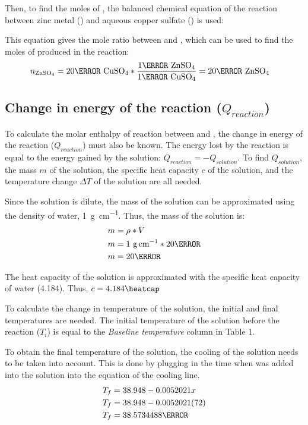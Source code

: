 \documentclass[demo, 12pt, notitlepage, letterpaper]{report}
\begin{document}
Then, to find the moles of , the balanced chemical equation of the reaction between zinc metal () and aqueous copper sulfate () is used:

\centerline{}

This equation gives the mole ratio between  and , which can be used to find the moles of  produced in the reaction:
\begin{align*}
	n_{\ce{ZnSO4}} & = 20\mmol~\ce{CuSO4} * \frac{1\mol~{\ce{ZnSO4}}}{1\mol~{\ce{CuSO4}}} = 20\mmol~{\ce{ZnSO4}}
\end{align*}

\subsection*{Change in energy of the reaction ($Q_{reaction}$)}

To calculate the molar enthalpy of reaction between  and , the change in energy of the reaction ($Q_{reaction}$) must also be known. The energy lost by the reaction is equal to the energy gained by the solution: $Q_{reaction} = -Q_{solution}$. To find $Q_{solution}$, the mass $m$ of the solution, the specific heat capacity $c$ of the solution, and the temperature change $\Delta T$ of the solution are all needed.

Since the solution is dilute, the mass of the solution can be approximated using the density of water, 1~\unit{\gram\per\cm}. Thus, the mass of the solution is:
\begin{align*}
	m & = \rho * V                      \\
	m & = 1~\unit{\gram\per\cm} * 20\ml \\
	m & = 20\gram
\end{align*}

The heat capacity of the solution is approximated with the specific heat capacity of water (4.184\heatcap). Thus, $c = 4.184\heatcap$

To calculate the change in temperature of the solution, the initial and final temperatures are needed. The initial temperature of the solution before the reaction ($T_i$) is equal to the \textit{Baseline temperature} column in Table 1.

To obtain the final temperature of the solution, the cooling of the solution needs to be taken into account. This is done by plugging in the time when  was added into the solution into the equation of the cooling line.
\begin{align*}
	T_f & = 38.948 - 0.0052021x    \\
	T_f & = 38.948 - 0.0052021(72) \\
	T_f & = 38.5734488\celsius
\end{align*}
\end{document}
